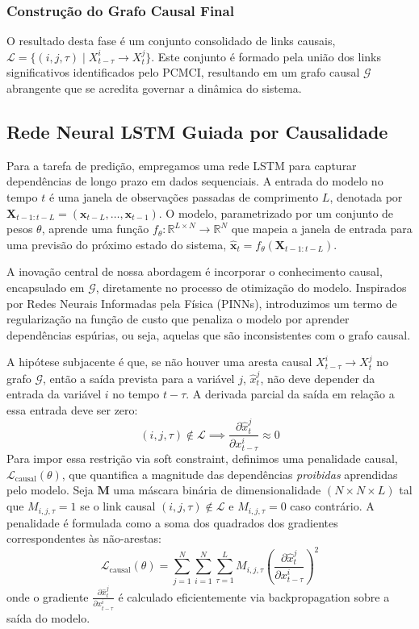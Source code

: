 \documentclass[12pt, a4paper]{article}
\begin{document}
\subsubsection{Construção do Grafo Causal Final}
O resultado desta fase é um conjunto consolidado de links causais, $\mathcal{L} = \{(i, j, \tau) \mid X^i_{t-\tau} \rightarrow X^j_t\}$. Este conjunto é formado pela união dos links significativos identificados pelo PCMCI, resultando em um grafo causal $\mathcal{G}$ abrangente que se acredita governar a dinâmica do sistema.

\subsection{Rede Neural LSTM Guiada por Causalidade}
Para a tarefa de predição, empregamos uma rede LSTM para capturar dependências de longo prazo em dados sequenciais. A entrada do modelo no tempo $t$ é uma janela de observações passadas de comprimento $L$, denotada por $\mathbf{X}_{t-1:t-L} = (\mathbf{x}_{t-L}, \dots, \mathbf{x}_{t-1})$. O modelo, parametrizado por um conjunto de pesos $\theta$, aprende uma função $f_\theta: \mathbb{R}^{L \times N} \to \mathbb{R}^N$ que mapeia a janela de entrada para uma previsão do próximo estado do sistema, $\hat{\mathbf{x}}_t = f_\theta(\mathbf{X}_{t-1:t-L})$.

A inovação central de nossa abordagem é incorporar o conhecimento causal, encapsulado em $\mathcal{G}$, diretamente no processo de otimização do modelo. Inspirados por Redes Neurais Informadas pela Física (PINNs), introduzimos um termo de regularização na função de custo que penaliza o modelo por aprender dependências espúrias, ou seja, aquelas que são inconsistentes com o grafo causal.

A hipótese subjacente é que, se não houver uma aresta causal $X^i_{t-\tau} \rightarrow X^j_t$ no grafo $\mathcal{G}$, então a saída prevista para a variável $j$, $\hat{x}^j_t$, não deve depender da entrada da variável $i$ no tempo $t-\tau$. A derivada parcial da saída em relação a essa entrada deve ser zero:
$$
(i, j, \tau) \notin \mathcal{L} \implies \frac{\partial \hat{x}^j_t}{\partial x^i_{t-\tau}} \approx 0
$$
Para impor essa restrição via soft constraint, definimos uma penalidade causal, $\mathcal{L}_{\text{causal}}(\theta)$, que quantifica a magnitude das dependências \emph{proibidas} aprendidas pelo modelo. Seja $\mathbf{M}$ uma máscara binária de dimensionalidade $(N \times N \times L)$ tal que $M_{i,j,\tau} = 1$ se o link causal $(i,j,\tau) \notin \mathcal{L}$ e $M_{i,j,\tau} = 0$ caso contrário. A penalidade é formulada como a soma dos quadrados dos gradientes correspondentes às não-arestas:
$$
\mathcal{L}_{\text{causal}}(\theta) = \sum_{j=1}^{N} \sum_{i=1}^{N} \sum_{\tau=1}^{L} M_{i,j,\tau} \left( \frac{\partial \hat{x}^j_t}{\partial x^i_{t-\tau}} \right)^2
$$
onde o gradiente $\frac{\partial \hat{x}^j_t}{\partial x^i_{t-\tau}}$ é calculado eficientemente via backpropagation sobre a saída do modelo.
\end{document}
